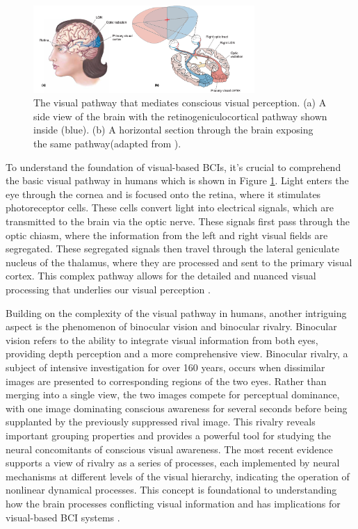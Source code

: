 \begin{figure}
    \centering
    \includegraphics[width=0.75\textwidth]{images/intro/visual pathways.png}
    \caption{The visual pathway that mediates conscious visual perception. (a) A side view of the brain with the retinogeniculocortical pathway shown inside (blue). (b) A horizontal section through the brain exposing the same pathway(adapted from \cite{bear2016neuroscience}).}
    \label{fig:visual}
\end{figure}

To understand the foundation of visual-based BCIs, it's crucial to comprehend the basic visual pathway in humans which is shown in Figure \ref{fig:visual}. Light enters the eye through the cornea and is focused onto the retina, where it stimulates photoreceptor cells. These cells convert light into electrical signals, which are transmitted to the brain via the optic nerve. These signals first pass through the optic chiasm, where the information from the left and right visual fields are segregated. These segregated signals then travel through the lateral geniculate nucleus of the thalamus, where they are processed and sent to the primary visual cortex. This complex pathway allows for the detailed and nuanced visual processing that underlies our visual perception \cite{bear2016neuroscience}.

Building on the complexity of the visual pathway in humans, another intriguing aspect is the phenomenon of binocular vision and binocular rivalry. Binocular vision refers to the ability to integrate visual information from both eyes, providing depth perception and a more comprehensive view. Binocular rivalry, a subject of intensive investigation for over 160 years, occurs when dissimilar images are presented to corresponding regions of the two eyes. Rather than merging into a single view, the two images compete for perceptual dominance, with one image dominating conscious awareness for several seconds before being supplanted by the previously suppressed rival image. This rivalry reveals important grouping properties and provides a powerful tool for studying the neural concomitants of conscious visual awareness. The most recent evidence supports a view of rivalry as a series of processes, each implemented by neural mechanisms at different levels of the visual hierarchy, indicating the operation of nonlinear dynamical processes. This concept is foundational to understanding how the brain processes conflicting visual information and has implications for visual-based BCI systems \cite{blake2002visual}.

